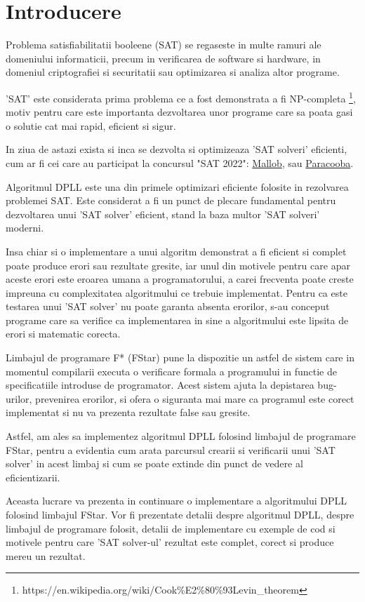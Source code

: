 \chapter*{Introducere} 

Problema satisfiabilitatii booleene (SAT) se regaseste in multe ramuri ale \linebreak domeniului informaticii, precum in verificarea de software si hardware, in domeniul criptografiei si securitatii sau optimizarea si analiza altor programe.

'SAT' este considerata prima problema ce a fost demonstrata a fi NP-completa \footnote{https://en.wikipedia.org/wiki/Cook\%E2\%80\%93Levin\_theorem}, motiv pentru care este importanta dezvoltarea unor programe care sa poata gasi o solutie cat mai rapid, eficient si sigur. 

In ziua de astazi exista si inca se dezvolta si optimizeaza 'SAT solveri' eficienti, cum ar fi cei care au participat la concursul "SAT 2022": \href{https://www.dominikschreiber.de/papers/2022-mallob.pdf}{Mallob}, sau \href{https://github.com/maximaximal/Paracooba#readme
}{Paracooba}.

Algoritmul DPLL este una din primele optimizari eficiente folosite in rezolvarea problemei SAT. Este considerat a fi un punct de plecare fundamental pentru \linebreak dezvoltarea unui 'SAT solver' eficient, stand la baza multor 'SAT solveri' moderni.

Insa chiar si o implementare a unui algoritm demonstrat a fi eficient si complet poate produce erori sau rezultate gresite, iar unul din motivele pentru care apar aceste erori este eroarea umana a programatorului, a carei frecventa poate creste impreuna cu complexitatea algoritmului ce trebuie implementat. Pentru ca este testarea unui 'SAT solver' nu poate garanta absenta erorilor, s-au conceput programe care sa verifice ca implementarea in sine a algoritmului este lipsita de erori si matematic corecta.

Limbajul de programare F* (FStar) pune la dispozitie un astfel de sistem care in momentul compilarii executa o verificare formala a programului in functie de \linebreak specificatiile introduse de programator. Acest sistem ajuta la depistarea bug-urilor, prevenirea erorilor, si ofera o siguranta mai mare ca programul este corect \linebreak implementat si nu va prezenta rezultate false sau gresite.

Astfel, am ales sa implementez algoritmul DPLL folosind limbajul de programare FStar, pentru a evidentia cum arata parcursul crearii si verificarii unui 'SAT solver' in acest limbaj si cum se poate extinde din punct de vedere al eficientizarii.

Aceasta lucrare va prezenta in continuare o implementare a algoritmului DPLL folosind limbajul FStar. Vor fi prezentate detalii despre algoritmul DPLL, despre limbajul de programare folosit, detalii de implementare cu exemple de cod si motivele pentru care 'SAT solver-ul' rezultat este complet, corect si produce mereu un rezultat.


